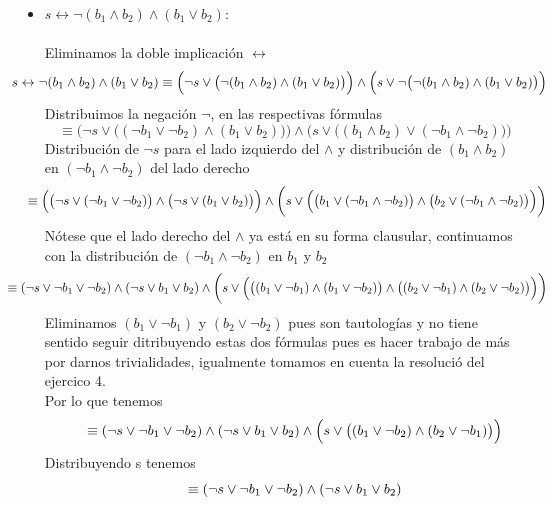 \documentclass[12pt,letterpaper]{article}
\begin{document}
\begin{enumerate}
  \begin{itemize}[label=\textbullet]
  \item $s \leftrightarrow \neg (b_1 \land b_2) \land (b_1 \lor b_2)$:\\
    \\
    Eliminamos la doble implicaci\'{o}n $\leftrightarrow$
    \[
    \hspace{-0.9cm}
    s \leftrightarrow \neg (b_1 \land b_2) \land (b_1 \lor b_2)
    \equiv
    \Big(\neg s\lor \big(\neg (b_1 \land b_2) \land (b_1 \lor b_2) \big) \Big)
    \land
    \Big(s \lor \neg \big(\neg (b_1 \land b_2) \land (b_1 \lor b_2)\big) \Big)
    \]
    Distribuimos la negaci\'{o}n $\neg$, en las respectivas f\'{o}rmulas
    \[
    \equiv
    \Big(\neg s\lor \big((\neg b_1 \lor \neg b_2) \land (b_1 \lor b_2) \big) \Big)
    \land
    \Big(s \lor \big((b_1 \land b_2) \lor (\neg b_1 \land \neg b_2)\big) \Big)
    \]
    Distribuci\'{o}n de $\neg s$ para el lado izquierdo del $\land$ y distribuci\'{o}n de $(b_1 \land b_2)$ en $(\neg b_1 \land \neg b_2)$ del lado derecho
    \[
    \hspace{-0.5cm}
    \equiv
    \Big(\big(\neg s\lor (\neg b_1 \lor \neg b_2)\big) \land \big(\neg s \lor (b_1 \lor b_2) \big) \Big)
    \land
    \bigg(s \lor \Big(\big(b_1 \lor (\neg b_1 \land \neg b_2)\big)
    \land \big(b_2 \lor (\neg b_1 \land \neg b_2)\big)\Big)\bigg)
    \]
    N\'{o}tese que el lado derecho del $\land$ ya est\'{a} en su forma clausular, continuamos con la distribuci\'{o}n de $(\neg b_1 \land \neg b_2)$ en $b_1$ y $b_2$
    \[
    \hspace{-1.1cm}
    \equiv
    (\neg s\lor \neg b_1 \lor \neg b_2) \land (\neg s \lor b_1 \lor b_2)
    \land
    \bigg(s \lor \Big(\big((b_1 \lor \neg b_1) \land (b_1 \lor \neg b_2)\big)
    \land \big((b_2 \lor \neg b_1) \land (b_2 \lor \neg b_2)\big)\Big)\bigg)
    \]
    Eliminamos $(b_1 \lor \neg b_1)$ y $(b_2 \lor \neg b_2)$ pues son tautolog\'{i}as y no tiene sentido seguir ditribuyendo estas dos f\'{o}rmulas pues es hacer trabajo de m\'{a}s por darnos trivialidades, igualmente tomamos en cuenta la resoluci\'{o} del ejercico 4.\\
    Por lo que tenemos
    \[ 
    \hspace{0.5cm}
    \equiv
    (\neg s\lor \neg b_1 \lor \neg b_2) \land (\neg s \lor b_1 \lor b_2)
    \land
    \Big(s \lor \big((b_1 \lor \neg b_2)\land (b_2 \lor \neg b_1)\big)\Big)
    \]
    Distribuyendo s tenemos
    \[ 
    \hspace{0.5cm}
    \equiv
    (\neg s\lor \neg b_1 \lor \neg b_2) \land (\neg s \lor b_1 \lor b_2)
\]
\end{itemize}
\end{enumerate}
\end{document}
